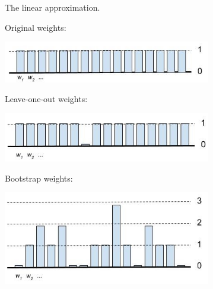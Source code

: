 \begin{frame}{The linear approximation.}
%
%

\begin{minipage}{0.49\textwidth}
     {
    Original weights: \par
    \includegraphics[width=0.68\textwidth]{static_figures/orig_weights}
    }
     {
    \par Leave-one-out weights: \par
    \includegraphics[width=0.68\textwidth]{static_figures/weights_loo}
    }
     {
    \par Bootstrap weights: \par
    \includegraphics[width=0.68\textwidth]{static_figures/boot_weights}
    }
\end{minipage}
\begin{minipage}{0.49\textwidth}
\end{minipage}
\end{frame}
